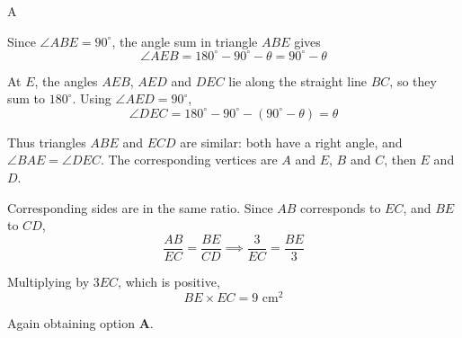 \documentclass[11pt,a4paper]{article}
\begin{document}
\begin{enumerate}[label=\textbf{\arabic*.},leftmargin=*,itemsep=0pt,start=2]
\begin{djsSolution}{A}
\begin{djsSolutionFigure}
\end{djsSolutionFigure}

Since $\angle ABE=90^\circ$, the angle sum in triangle $ABE$ gives
\[
\angle AEB=180^\circ-90^\circ-\theta=90^\circ-\theta
\]

At $E$, the angles $AEB$, $AED$ and $DEC$ lie along the straight line $BC$, so they sum to $180^\circ$. Using $\angle AED=90^\circ$,
\[
\angle DEC=180^\circ-90^\circ-(90^\circ-\theta)=\theta
\]

Thus triangles $ABE$ and $ECD$ are similar: both have a right angle, and $\angle BAE=\angle DEC$. The corresponding vertices are $A$ and $E$, $B$ and $C$, then $E$ and $D$.

Corresponding sides are in the same ratio. Since $AB$ corresponds to $EC$, and $BE$ to $CD$,
\[
\frac{AB}{EC}=\frac{BE}{CD}
\implies \frac{3}{EC}=\frac{BE}{3}
\]

Multiplying by $3EC$, which is positive,
\[
BE\times EC=9\text{ cm}^2
\]

Again obtaining option \textbf{A}.
\end{djsSolution}
\end{enumerate}
\clearpage
\thispagestyle{djssolutions}
\vspace*{8pt}
\end{document}
